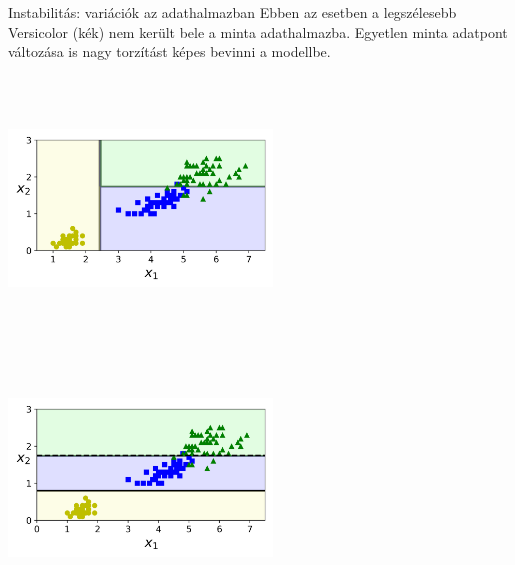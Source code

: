 \documentclass[english, aspectratio=169]{beamer}
\begin{document}
\begin{frame}{Instabilitás: variációk az adathalmazban}
Ebben az esetben a legszélesebb Versicolor (kék) nem került bele a minta adathalmazba. Egyetlen minta adatpont változása is nagy torzítást képes bevinni a modellbe.
\begin{center}
\includegraphics[width=7cm, height=7cm, keepaspectratio]{images/decision_trees_9.png}\includegraphics[width=7cm, height=7cm, keepaspectratio]{images/decision_trees_11.png}
\end{center}
\end{frame}
\end{document}
